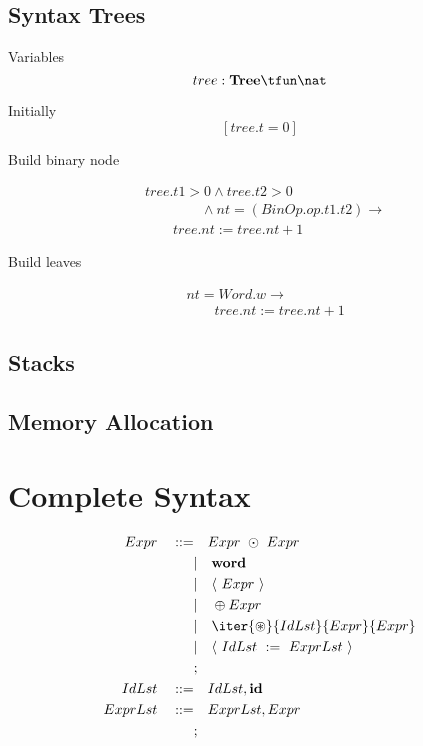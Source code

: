\documentclass[10pt]{report}
\newcommand{\word}{\textbf{word}}
\newcommand{\ID}{\textbf{id}}
\newcommand{\type}[2]{#1 : #2}
\begin{document}
\section{Syntax Trees}

Variables
\[
\type{tree}{\textbf{Tree} \tfun \nat }
\]

Initially
\[
	[ tree.t = 0 ]
\]

Build binary node

\begin{align*}
& tree.t1 > 0 %
	\land  tree.t2 > 0  \\ & \qquad \qquad
	\land nt = (BinOp.op.t1.t2) \longrightarrow \\
& \qquad tree.nt := tree.nt + 1
\end{align*}

Build leaves

\begin{align*}
& nt = Word.w  \longrightarrow \\
& \qquad tree.nt := tree.nt + 1
\end{align*}



\section{Stacks}

\section{Memory Allocation}

\chapter{Complete Syntax}

\begin{align*}
		Expr \quad ::= & \quad Expr  \ \odot \ Expr  \\
		& | \quad \word \\
		& | \quad \langle \ Expr \ \rangle \\
		& | \quad \oplus Expr \\
		& | \quad \iter{\circledast}{IdLst}{Expr}{Expr} \\
		& | \quad \langle \ IdLst \ := \ ExprLst \ \rangle \\
		& ; \\
		IdLst \quad ::= & \quad IdLst, \ID \\
		ExprLst \quad ::= & \quad ExprLst, Expr \\
		& ; 
\end{align*}
\end{document}
